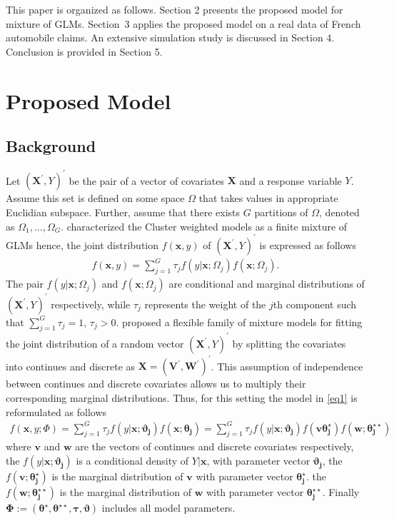\documentclass[11pt,letterpaper]{article}
\numberwithin{equation}{section}
\numberwithin{equation}{section}
\numberwithin{equation}{section}
\begin{document}
This paper is organized as follows. Section 2 presents the proposed model for mixture of GLMs. Section~3 applies the proposed model on a real data of French automobile claims. An extensive simulation study is discussed in Section 4. Conclusion is provided in Section 5.


\section{Proposed Model}

\subsection{Background}

Let $(\bm{X^{'}}, Y)^{'}$  be the pair of a vector of covariates  $\bm{X}$ and a response variable $Y$. Assume this set is defined on some space $\Omega$ that takes values in appropriate Euclidian subspace. Further, assume that there exists $G$ partitions of $\Omega$, denoted as $\Omega_1, \ldots, \Omega_G$.  \cite{Gershenfeld:1997} characterized the Cluster weighted models as a finite mixture of GLMs hence, the joint distribution $f(\bm x, y)$ of $(\bm{X^{'}}, Y )^{'}$  is expressed as follows
 \begin{align}
 f(\bm x, y)= \sum_{j=1}^{G} \tau_j f(y|\bm{x};\Omega_j)f(\bm{x};\Omega_j).
\label{eq1}
\end{align}
\flushleft The pair $f(y|\bm{x};\Omega_j)$ and $f(\bm{x};\Omega_j)$ are conditional and marginal distributions of $(\bm{X^{'}}, Y)^{'}$ respectively, while $\tau_j$ represents the weight of the $j$th component such that $\sum_{j=1}^{G}\tau_j=1$, $\tau_j>0$.
\cite{Ingrassia+Punzo+Vittadini+Minotti:2015} proposed a flexible family of mixture models for fitting the joint distribution of a random vector $(\bm{X^{'}}, Y)^{'}$ by splitting the covariates into continues and discrete as $ \bm{X}=(\bm{V^{'}},  \bm{W^{'}})^{'}$. This assumption of independence between continues and discrete covariates allows us to multiply their corresponding marginal distributions. Thus, for this setting the model in \eqref{eq1} is reformulated as follows
\begin{align}
 f(\bm x, y; \Phi)= \sum_{j=1}^{G} \tau_j f(y|\bm{x};\bm{\vartheta_j})f(\bm{x};\bm{\theta_j})=\sum_{j=1}^{G} \tau_j f(y|\bm{x};\bm{\vartheta_j})f(\bm{v} \bm{\theta_j^{\star}})f(\bm{w};\bm{\theta_j^{\star\star}})
\label{eq2}
\end{align}
where $\bm{v}$ and $\bm{w}$ are the vectors of continues and discrete covariates respectively, the $f(y|\bm{x};\bm{\vartheta_j})$ is a conditional density of $Y|\bm{x}$, with parameter vector $\bm{\vartheta_j}$, the $f(\bm{v};\bm{\theta_j^{\star}})$ is the marginal distribution of $\bm{v}$ with parameter vector $\bm{\theta_j^{\star}}$. the $f(\bm{w};\bm{\theta_j^{\star\star}})$ is the marginal distribution of $\bm{w}$ with parameter vector $\bm{\theta_j^{\star\star}}$. Finally $\bm{\Phi}:=(\bm{\theta^{\star}},\bm{\theta^{\star\star}}, \bm{\tau}, \bm{\vartheta})$ includes all model parameters. %
\end{document}
